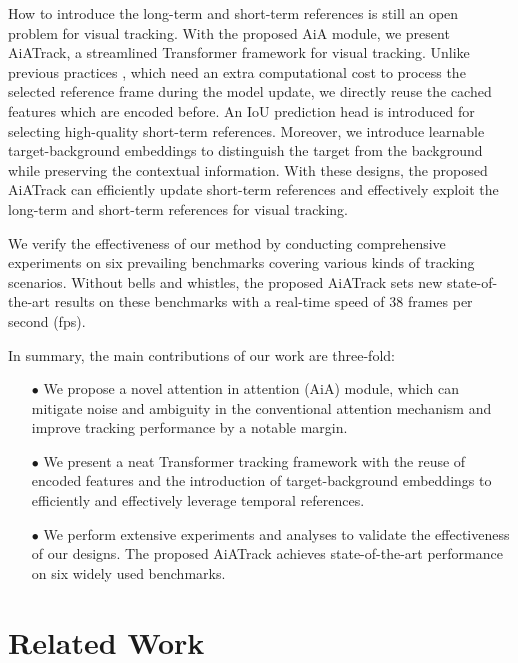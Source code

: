 How to introduce the long-term and short-term references is still an open problem for visual tracking. With the proposed AiA module, we present AiATrack, a streamlined Transformer framework for visual tracking. Unlike previous practices \cite{zhang2019learning,fu2021stmtrack,wang2021transformer,yan2021learning}, which need an extra computational cost to process the selected reference frame during the model update, we directly reuse the cached features which are encoded before. An IoU prediction head is introduced for selecting high-quality short-term references. Moreover, we introduce learnable target-background embeddings to distinguish the target from the background while preserving the contextual information. With these designs, the proposed AiATrack can efficiently update short-term references and effectively exploit the long-term and short-term references for visual tracking.

We verify the effectiveness of our method by conducting comprehensive experiments on six prevailing benchmarks covering various kinds of tracking scenarios. Without bells and whistles, the proposed AiATrack sets new state-of-the-art results on these benchmarks with a real-time speed of 38 frames per second (fps).

In summary, the main contributions of our work are three-fold:
\begin{itemize}
    \item[$\bullet$] We propose a novel attention in attention (AiA) module, which can mitigate noise and ambiguity in the conventional attention mechanism \cite{vaswani2017attention} and improve tracking performance by a notable margin.
    \item[$\bullet$] We present a neat Transformer tracking framework with the reuse of encoded features and the introduction of target-background embeddings to efficiently and effectively leverage temporal references.
    \item[$\bullet$] We perform extensive experiments and analyses to validate the effectiveness of our designs. The proposed AiATrack achieves state-of-the-art performance on six widely used benchmarks.
\end{itemize}

\section{Related Work}

